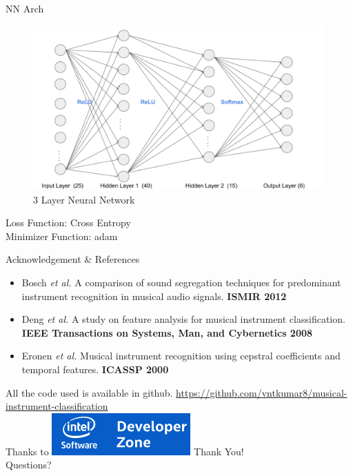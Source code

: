 \documentclass[11pt]{beamer}
\begin{document}
\begin{frame}{NN Arch}
	 \begin{figure}
	 	\centering
	 	\includegraphics[width=0.85\linewidth]{nn.pdf}
	 	\caption{3 Layer Neural Network}
	 	\label{fig:nn}
	 \end{figure}
	 Loss Function: Cross Entropy\\
	 Minimizer Function: adam
\end{frame}
\begin{frame}{Acknowledgement \& References}

\begin{multicols}{2}
	\scriptsize
	\begin{itemize}
		\item Bosch \textit{et al.} A comparison of sound
		segregation techniques for predominant instrument recognition in musical audio signals. \textbf{ISMIR 2012}
		\item  Deng \textit{et al.}  A study on feature analysis
		for musical instrument classification. \textbf{IEEE Transactions on Systems, Man, and Cybernetics 2008}
		\item Eronen \textit{et al.} Musical instrument recognition using cepstral coefficients and
		temporal features.  \textbf{ICASSP 2000}
	\end{itemize}
	
\columnbreak
	All the code used is available in github.
{\url{https://github.com/vntkumar8/musical-instrument-classification}}
\\

\vspace{0.7in}
Thanks to \includegraphics[width=0.4\linewidth]{intel}
\vspace{0.5in}
\flushright
\Large
Thank You!\\
Questions?
\end{multicols}


	    


\end{frame}
\end{document}

